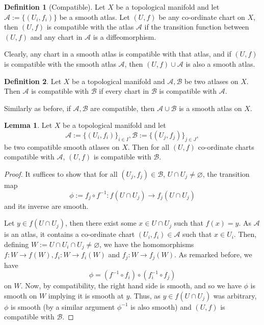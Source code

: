 \documentclass[]{article}
\theoremstyle{definition}
\theoremstyle{definition}
\newtheorem{definition}{Definition}[section]
\newtheorem{lemma}{Lemma}[section]
\begin{document}
\begin{definition}[Compatible]
  Let \(X\) be a topological manifold and let \(\mathcal{A} := \{(U_i, f_i)\}\) 
  be a smooth atlas. Let \((U, f)\) be any co-ordinate chart on \(X\), then 
  \((U, f)\) is compatible with the atlas \(\mathcal{A}\) if the transition 
  function between \((U, f)\) and any chart in \(\mathcal{A}\) is a 
  diffeomorphism.
\end{definition}

Clearly, any chart in a smooth atlas is compatible with that atlas, and if 
\((U, f)\) is compatible with the smooth atlas \(\mathcal{A}\), then 
\((U, f) \cup \mathcal{A}\) is also a smooth atlas.

\begin{definition}
  Let \(X\) be a topological manifold and \(\mathcal{A}, \mathcal{B}\) be 
  two atlases on \(X\). Then \(\mathcal{A}\) is compatible with \(\mathcal{B}\) 
  if every chart in \(\mathcal{B}\) is compatible with \(\mathcal{A}\).
\end{definition}

Similarly as before, if \(\mathcal{A}, \mathcal{B}\) are compatible, then 
\(\mathcal{A} \cup \mathcal{B}\) is a smooth atlas on \(X\).

\begin{lemma}
  Let \(X\) be a topological manifold and let 
  \[\mathcal{A} := \{(U_i, f_i)\}_{i \in I}, 
    \mathcal{B} := \{(U_j, f_j)\}_{j \in J},\]
  be two compatible smooth atlases on \(X\). Then for all \((U, f)\) co-ordinate 
  charts compatible with \(\mathcal{A}\), \((U, f)\) is compatible with 
  \(\mathcal{B}\).
\end{lemma}
\begin{proof}
  It suffices to show that for all \((U_j, f_j) \in \mathcal{B}\), 
  \(U \cap U_j \neq \varnothing\), the transition map 
  \[\phi := f_j \circ f^{-1} : f(U \cap U_j) \to f_j(U \cap U_j)\]
  and its inverse are smooth. 

  Let \(y \in f(U \cap U_j)\), then there exist some \(x \in U \cap U_j\) such 
  that \(f(x) = y\). As \(\mathcal{A}\) is an atlas, it contains a co-ordinate 
  chart \((U_i, f_i) \in \mathcal{A}\) such that \(x \in U_i\). Then, defining 
  \(W := U \cap U_i \cap U_j \neq \varnothing\), we have the homomorphisms 
  \(f : W \to f(W), f_i : W \to f_i(W)\) and \(f_j : W \to f_j(W)\). As 
  remarked before, we have 
  \[\phi = (f^{-1} \circ f_i) \circ (f_i^{-1} \circ f_j)\]
  on \(W\). Now, by compatibility, the right hand side is smooth, and so 
  we have \(\phi\) is smooth on \(W\) implying it is smooth at \(y\). Thus, 
  as \(y \in f(U \cap U_j)\) was arbitrary, \(\phi\) is smooth (by a similar 
  argument \(\phi^{-1}\) is also smooth) and \((U, f)\) is compatible with 
  \(\mathcal{B}\).
\end{proof}
\end{document}
